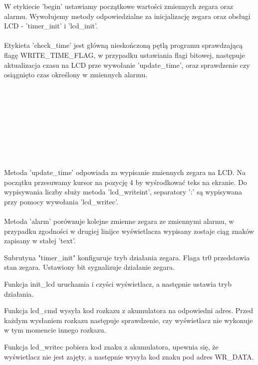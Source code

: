 \documentclass[12pt,a4paper]{article}
\begin{document}
		\begin{minipage}{.5\textwidth}
			
		\end{minipage}%
		\begin{minipage}{.5\textwidth}
			W etykiecie 'begin' ustawiamy początkowe wartości zmiennych zegara oraz alarmu. Wywołujemy metody
			odpowiedzialne za inicjalizację zegara oraz obsługi LCD - 'timer\_init' i 'lcd\_init'.\\\\
			Etykieta 'check\_time' jest główną nieskończoną pętlą programu sprawdzającą flagę WRITE\_TIME\_FLAG,
			w przypadku ustawiania flagi bitowej, następuje aktualizacja czasu na LCD prze wywołanie 'update\_time',
			oraz sprawdzenie czy osiągnięto czas określony w zmiennych alarmu.\\\\\\\\\\\\\\\\\\\\
			Metoda 'update\_time' odpowiada za wypisanie zmiennych zegara na LCD. Na początku przesuwamy kursor na
			pozycję 4 by wyśrodkować teks na ekranie. Do wypisywania liczby służy metoda 'lcd\_writeint', 
			separatory ':' są wypisywana przy pomocy wywołania 'lcd\_writec'.\\\\
			Metoda 'alarm' porównuje kolejne zmienne zegara ze zmiennymi alarmu, w przypadku zgodności w drugiej
			linijce wyświetlacza wypisany zostaje ciąg znaków zapisany w stałej 'text'.
		\end{minipage}
		
		\begin{minipage}{.5\textwidth}
			
		\end{minipage}%
		\begin{minipage}{.5\textwidth}
			Subrutyna "timer\_init" konfiguruje tryb działania zegara. Flaga tr0 przedstawia stan zegara. Ustawiony bit sygnalizuje działanie zegara.
			\vspace{5cm}

			Funkcja init\_lcd uruchamia i czyści wyświetlacz, a następnie ustawia tryb działania.
			\vspace{3cm}

			Funkcja lcd\_cmd wysyła kod rozkazu z akumulatora na odpowiedni adres.
			Przed każdym wysłaniem rozkazu następuje sprawdzenie, czy wyświetlacz nie wykonuje w tym momencie innego rozkazu.
			\vspace{2cm}

			Funkcja lcd\_writec pobiera kod znaku z akumulatora, upewnia się, że wyświetlacz nie jest zajęty, a następnie wysyła kod znaku pod adres WR\_DATA.
		\end{minipage}
		
\end{document}
